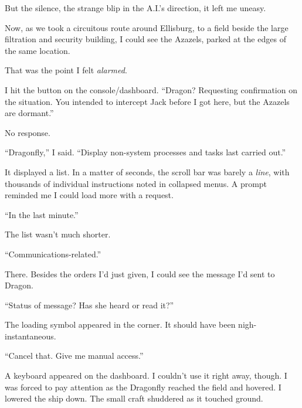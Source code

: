 But the silence, the strange blip in the A.I.'s direction, it left me uneasy.



Now, as we took a circuitous route around Ellisburg, to a field beside the large filtration and security building, I could see the Azazels, parked at the edges of the same location.



That was the point I felt \emph{alarmed}.



I hit the button on the console/dashboard. ``Dragon?  Requesting confirmation on the situation.  You intended to intercept Jack before I got here, but the Azazels are dormant.''



No response.



``Dragonfly,'' I said.  ``Display non-system processes and tasks last carried out.''



It displayed a list.  In a matter of seconds, the scroll bar was barely a \emph{line}, with thousands of individual instructions noted in collapsed menus.  A prompt reminded me I could load more with a request.



``In the last minute.''



The list wasn't much shorter.



``Communications-related.''



There.  Besides the orders I'd just given, I could see the message I'd sent to Dragon.



``Status of message?  Has she heard or read it?''



The loading symbol appeared in the corner.  It should have been nigh-instantaneous.



``Cancel that.  Give me manual access.''



A keyboard appeared on the dashboard.  I couldn't use it right away, though.  I was forced to pay attention as the Dragonfly reached the field and hovered.  I lowered the ship down.  The small craft shuddered as it touched ground.



